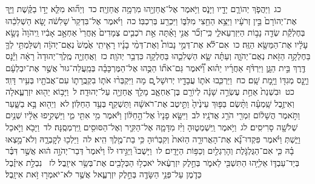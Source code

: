 \documentclass[18pt]{article}
\newcommand{\kri}[1]{\Afootnote{#1}}	%
\begin{document}
 {\loc כג~}וַיַּהֲפֹ֧ךְ יְהוֹרָ֛ם יָדָ֖יו וַיָּנֹ֑ס וַיֹּ֥אמֶר אֶל־אֲחַזְיָ֖הוּ מִרְמָ֥ה אֲחַזְיָֽה׃ \startlock
 {\loc כד~}וְיֵה֞וּא מִלֵּ֧א יָד֣וֹ בַקֶּ֗שֶׁת וַיַּ֤ךְ אֶת־יְהוֹרָם֙ בֵּ֣ין זְרֹעָ֔יו וַיֵּצֵ֥א הַחֵ֖צִי מִלִּבּ֑וֹ וַיִּכְרַ֖ע בְּרִכְבּֽוֹ׃ \startlock
 {\loc כה~}וַיֹּ֗אמֶר אֶל־בִּדְקַר֙ שָׁלִשֹׁ֔ה שָׂ֚א הַשְׁלִכֵ֔הוּ בְּחֶלְקַ֕ת שְׂדֵ֖ה נָב֣וֹת הַיִּזְרְעֵאלִ֑י כִּֽי־זְכֹ֞ר אֲנִ֣י וָאַ֗תָּה אֵ֣ת רֹכְבִ֤ים צְמָדִים֙ אַֽחֲרֵי֙ אַחְאָ֣ב אָבִ֔יו וַֽיהֹוָה֙ נָשָׂ֣א עָלָ֔יו אֶת־הַמַּשָּׂ֖א הַזֶּֽה׃ \startlock
 {\loc כו~}אִם־לֹ֡א אֶת־דְּמֵ֣י נָבוֹת֩ וְאֶת־דְּמֵ֨י בָנָ֜יו רָאִ֤יתִֽי אֶ֙מֶשׁ֙ נְאֻם־יְהֹוָ֔ה וְשִׁלַּמְתִּ֥י לְךָ֛ בַּחֶלְקָ֥ה הַזֹּ֖את נְאֻם־יְהֹוָ֑ה וְעַתָּ֗ה שָׂ֧א הַשְׁלִכֵ֛הוּ בַּחֶלְקָ֖ה כִּדְבַ֥ר יְהֹוָֽה׃ \startlock
 {\loc כז~}וַאֲחַזְיָ֤ה מֶֽלֶךְ־יְהוּדָה֙ רָאָ֔ה וַיָּ֕נׇס דֶּ֖רֶךְ בֵּ֣ית הַגָּ֑ן וַיִּרְדֹּ֨ף אַחֲרָ֜יו יֵה֗וּא וַ֠יֹּ֠אמֶר גַּם־אֹת֞וֹ הַכֻּ֣הוּ אֶל־הַמֶּרְכָּבָ֗ה בְּמַֽעֲלֵה־גוּר֙ אֲשֶׁ֣ר אֶת־יִבְלְעָ֔ם וַיָּ֥נׇס מְגִדּ֖וֹ וַיָּ֥מׇת שָֽׁם׃ \startlock
 {\loc כח~}וַיַּרְכִּ֧בוּ אֹת֛וֹ עֲבָדָ֖יו יְרוּשָׁל ָ֑͏ִם מָה וַיִּקְבְּר֨וּ אֹת֧וֹ בִקְבֻֽרָת֛וֹ עִם־אֲבֹתָ֖יו בְּעִ֥יר דָּוִֽד׃ \startlock
 {\loc כט~}וּבִשְׁנַת֙ אַחַ֣ת עֶשְׂרֵ֣ה שָׁנָ֔ה לְיוֹרָ֖ם בֶּן־אַחְאָ֑ב מָלַ֥ךְ אֲחַזְיָ֖ה עַל־יְהוּדָֽה׃ \startlock
 {\loc ל~}וַיָּב֥וֹא יֵה֖וּא יִזְרְעֶ֑אלָה וְאִיזֶ֣בֶל שָֽׁמְעָ֗ה וַתָּ֨שֶׂם בַּפּ֤וּךְ עֵינֶ֙יהָ֙ וַתֵּ֣יטֶב אֶת־רֹאשָׁ֔הּ וַתַּשְׁקֵ֖ף בְּעַ֥ד הַחַלּֽוֹן׃ \startlock
 {\loc לא~}וְיֵה֖וּא בָּ֣א בַשָּׁ֑עַר וַתֹּ֣אמֶר הֲשָׁל֔וֹם זִמְרִ֖י הֹרֵ֥ג אֲדֹנָֽיו׃ \startlock
 {\loc לב~}וַיִּשָּׂ֤א פָנָיו֙ אֶל־הַ֣חַלּ֔וֹן וַיֹּ֕אמֶר מִ֥י אִתִּ֖י מִ֑י וַיַּשְׁקִ֣יפוּ אֵלָ֔יו שְׁנַ֥יִם שְׁלֹשָׁ֖ה סָרִיסִֽים׃ \startlock
 {\loc לג~}וַיֹּ֥אמֶר  \edtext{(שמטהו)}{\kri{קרי: שִׁמְט֖וּהָ}}  וַֽיִּשְׁמְט֑וּהָ וַיִּ֨ז מִדָּמָ֧הּ אֶל־הַקִּ֛יר וְאֶל־הַסּוּסִ֖ים וַֽיִּרְמְסֶֽנָּה׃ \startlock
 {\loc לד~}וַיָּבֹ֖א וַיֹּ֣אכַל וַיֵּ֑שְׁתְּ וַיֹּ֗אמֶר פִּקְדוּ־נָ֞א אֶת־הָאֲרוּרָ֤ה הַזֹּאת֙ וְקִבְר֔וּהָ כִּ֥י בַת־מֶ֖לֶךְ הִֽיא׃ \startlock
 {\loc לה~}וַיֵּלְכ֖וּ לְקׇבְרָ֑הּ וְלֹא־מָ֣צְאוּ בָ֗הּ כִּ֧י אִם־הַגֻּלְגֹּ֛לֶת וְהָרַגְלַ֖יִם וְכַפּ֥וֹת הַיָּדָֽיִם׃ \startlock
 {\loc לו~}וַיָּשֻׁבוּ֮ וַיַּגִּ֣ידוּ לוֹ֒ וַיֹּ֙אמֶר֙ דְּבַר־יְהֹוָ֣ה ה֔וּא אֲשֶׁ֣ר דִּבֶּ֗ר בְּיַד־עַבְדּ֛וֹ אֵלִיָּ֥הוּ הַתִּשְׁבִּ֖י לֵאמֹ֑ר בְּחֵ֣לֶק יִזְרְעֶ֔אל יֹאכְל֥וּ הַכְּלָבִ֖ים אֶת־בְּשַׂ֥ר אִיזָֽבֶל׃ \startlock
 {\loc לז~}\edtext{(והית)}{\kri{קרי: וְֽהָיְתָ֞ה}}  נִבְלַ֣ת אִיזֶ֗בֶל כְּדֹ֛מֶן עַל־פְּנֵ֥י הַשָּׂדֶ֖ה בְּחֵ֣לֶק יִזְרְעֶ֑אל אֲשֶׁ֥ר לֹא־יֹאמְר֖וּ זֹ֥את אִיזָֽבֶל׃ 
\end{document}
